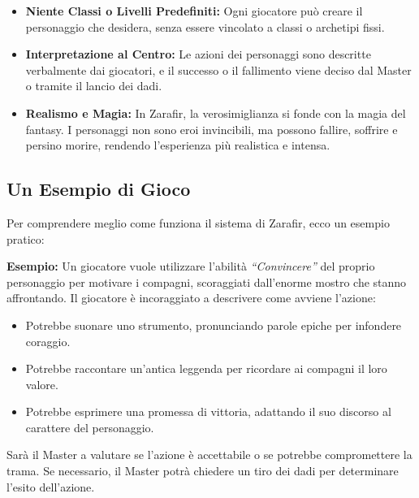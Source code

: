 \documentclass[../manuale_main.tex]{subfiles}
\begin{document}
\begin{itemize}
    \item \textbf{Niente Classi o Livelli Predefiniti:} Ogni giocatore può creare il personaggio che desidera, senza essere vincolato a classi o archetipi fissi.
    
    \item \textbf{Interpretazione al Centro:} Le azioni dei personaggi sono descritte verbalmente dai giocatori, e il successo o il fallimento viene deciso dal Master o tramite il lancio dei dadi.
    
    \item \textbf{Realismo e Magia:} In Zarafir, la verosimiglianza si fonde con la magia del fantasy. I personaggi non sono eroi invincibili, ma possono fallire, soffrire e persino morire, rendendo l’esperienza più realistica e intensa.
\end{itemize}

\vspace{0.3cm}

\subsection{Un Esempio di Gioco}
Per comprendere meglio come funziona il sistema di Zarafir, ecco un esempio pratico:

\vspace{0.2cm}

\textbf{Esempio:} Un giocatore vuole utilizzare l'abilità \textit{“Convincere”} del proprio personaggio per motivare i compagni, scoraggiati dall’enorme mostro che stanno affrontando. Il giocatore è incoraggiato a descrivere come avviene l'azione:

\begin{itemize}
    \item Potrebbe suonare uno strumento, pronunciando parole epiche per infondere coraggio.
    \item Potrebbe raccontare un'antica leggenda per ricordare ai compagni il loro valore.
    \item Potrebbe esprimere una promessa di vittoria, adattando il suo discorso al carattere del personaggio.
\end{itemize}

Sarà il Master a valutare se l'azione è accettabile o se potrebbe compromettere la trama. Se necessario, il Master potrà chiedere un tiro dei dadi per determinare l'esito dell'azione. 

\vspace{0.3cm}
\end{document}
